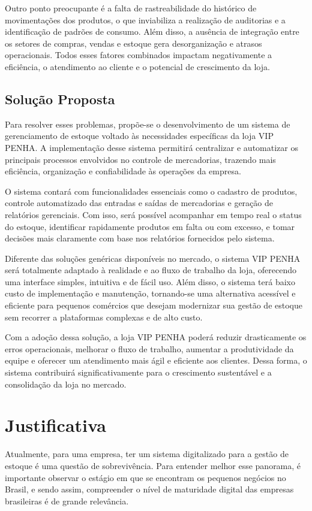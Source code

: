 \documentclass[
	12pt,				%
	openany,			%
	twoside,			%
	a4paper,			%
	english,			%
	brazil				%
	]{abntex2}
\begin{document}
Outro ponto preocupante é a falta de rastreabilidade do histórico de movimentações dos produtos, o que inviabiliza a realização de auditorias e a identificação de padrões de consumo. Além disso, a ausência de integração entre os setores de compras, vendas e estoque gera desorganização e atrasos operacionais. Todos esses fatores combinados impactam negativamente a eficiência, o atendimento ao cliente e o potencial de crescimento da loja.


\subsection{Solução Proposta}

Para resolver esses problemas, propõe-se o desenvolvimento de um sistema de gerenciamento de estoque voltado às necessidades específicas da loja VIP PENHA. A implementação desse sistema permitirá centralizar e automatizar os principais processos envolvidos no controle de mercadorias, trazendo mais eficiência, organização e confiabilidade às operações da empresa.

O sistema contará com funcionalidades essenciais como o cadastro de produtos, controle automatizado das entradas e saídas de mercadorias e geração de relatórios gerenciais. Com isso, será possível acompanhar em tempo real o status do estoque, identificar rapidamente produtos em falta ou com excesso, e tomar decisões mais claramente com base nos relatórios fornecidos pelo sistema.

Diferente das soluções genéricas disponíveis no mercado, o sistema VIP PENHA será totalmente adaptado à realidade e ao fluxo de trabalho da loja, oferecendo uma interface simples, intuitiva e de fácil uso. Além disso, o sistema terá baixo custo de implementação e manutenção, tornando-se uma alternativa acessível e eficiente para pequenos comércios que desejam modernizar sua gestão de estoque sem recorrer a plataformas complexas e de alto custo.

Com a adoção dessa solução, a loja VIP PENHA poderá reduzir drasticamente os erros operacionais, melhorar o fluxo de trabalho, aumentar a produtividade da equipe e oferecer um atendimento mais ágil e eficiente aos clientes. Dessa forma, o sistema contribuirá significativamente para o crescimento sustentável e a consolidação da loja no mercado.
 

\section{Justificativa}
Atualmente, para uma empresa, ter um sistema digitalizado para a gestão de estoque é uma questão de sobrevivência. Para entender melhor esse panorama, é importante observar o estágio em que se encontram os pequenos negócios no Brasil, e sendo assim, compreender o nível de maturidade digital das empresas brasileiras é de grande relevância. 
\end{document}
